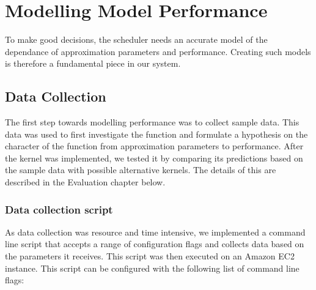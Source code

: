 \documentclass[a4paper,12pt,twoside,openright]{report}
\begin{document}
\section{Modelling Model Performance}
To make good decisions, the scheduler needs an accurate model of the dependance of approximation parameters and performance. Creating such models is therefore a fundamental piece in our system.

\subsection{Data Collection}
The first step towards modelling performance was to collect sample data. This data was used to first investigate the function and formulate a hypothesis on the character of the function from approximation parameters to performance. After the kernel was implemented, we tested it by comparing its predictions based on the sample data with possible alternative kernels. The details of this are described in the Evaluation chapter below.

\subsubsection{Data collection script}
As data collection was resource and time intensive, we implemented a command line script that accepts a range of configuration flags and collects data based on the parameters it receives. This script was then executed on an Amazon EC2 instance. This script can be configured with the following list of command line flags:
\end{document}
